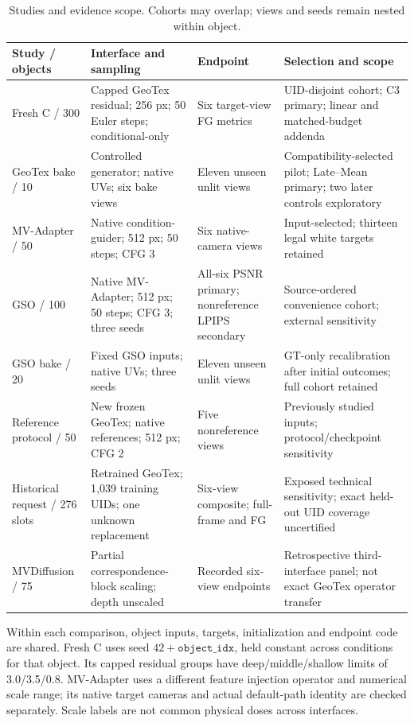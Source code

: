 \documentclass[times,twocolumn,final]{elsarticle}
\begin{document}
\begin{table}[t]
\centering\footnotesize\setlength{\tabcolsep}{3.5pt}\renewcommand{\arraystretch}{1.08}
\caption{Studies and evidence scope. Cohorts may overlap; views and seeds remain nested within object.}
\label{tab:study-design}
\begin{tabular}{p{}p{}p{}p{}}
\toprule Study / objects & Interface and sampling & Endpoint & Selection and scope \\
\midrule
Fresh C / 300 & Capped GeoTex residual; 256 px; 50 Euler steps; conditional-only & Six target-view FG metrics & UID-disjoint cohort; C3 primary; linear and matched-budget addenda \\
GeoTex bake / 10 & Controlled generator; native UVs; six bake views & Eleven unseen unlit views & Compatibility-selected pilot; Late--Mean primary; two later controls exploratory \\
MV-Adapter / 50 & Native condition-guider; 512 px; 50 steps; CFG 3 & Six native-camera views & Input-selected; thirteen legal white targets retained \\
GSO / 100 & Native MV-Adapter; 512 px; 50 steps; CFG 3; three seeds & All-six PSNR primary; nonreference LPIPS secondary & Source-ordered convenience cohort; external sensitivity \\
GSO bake / 20 & Fixed GSO inputs; native UVs; three seeds & Eleven unseen unlit views & GT-only recalibration after initial outcomes; full cohort retained \\
Reference protocol / 50 & New frozen GeoTex; native references; 512 px; CFG 2 & Five nonreference views & Previously studied inputs; protocol/checkpoint sensitivity \\
Historical request / 276 slots & Retrained GeoTex; 1,039 training UIDs; one unknown replacement & Six-view composite; full-frame and FG & Exposed technical sensitivity; exact held-out UID coverage uncertified \\
MVDiffusion / 75 & Partial correspondence-block scaling; depth unscaled & Recorded six-view endpoints & Retrospective third-interface panel; not exact GeoTex operator transfer \\
\bottomrule
\end{tabular}
\end{table}

Within each comparison, object inputs, targets, initialization and endpoint code are shared. Fresh C uses seed $42+\texttt{object\_idx}$, held constant across conditions for that object. Its capped residual groups have deep/middle/shallow limits of 3.0/3.5/0.8. MV-Adapter uses a different feature injection operator and numerical scale range; its native target cameras and actual default-path identity are checked separately. Scale labels are not common physical doses across interfaces.
\end{document}
